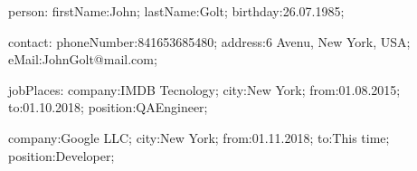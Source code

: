 person:
firstName:John;
lastName:Golt;
birthday:26.07.1985;

contact:
phoneNumber:841653685480;
address:6 Avenu, New York, USA;
eMail:JohnGolt@mail.com;

jobPlaces:
company:IMDB Tecnology;
city:New York;
from:01.08.2015;
to:01.10.2018;
position:QAEngineer;

company:Google LLC;
city:New York;
from:01.11.2018;
to:This time;
position:Developer;


